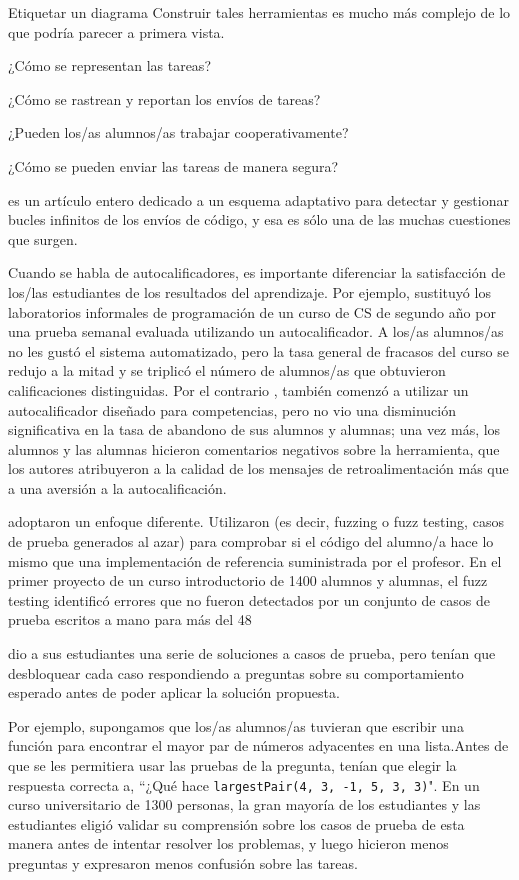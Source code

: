 \begin{aside}{Etiquetar un diagrama}
Construir tales herramientas es mucho más complejo de lo que podría parecer a primera vista.

¿Cómo se representan las tareas?

¿Cómo se rastrean y reportan los envíos de tareas?

¿Pueden los/as alumnos/as trabajar cooperativamente?

¿Cómo se pueden enviar las tareas de manera segura?

\cite{Edwa2014a} es un artículo entero dedicado a un esquema adaptativo para detectar y gestionar bucles infinitos de los envíos de código, y esa es sólo una de las muchas cuestiones que surgen.

Cuando se habla de autocalificadores, 
es importante diferenciar la satisfacción de los/las estudiantes de los resultados del aprendizaje.
Por ejemplo, 
\cite{Magu2018} sustituyó los laboratorios informales de programación de un curso de CS de segundo año por una prueba semanal evaluada utilizando un autocalificador.
A los/as alumnos/as no les gustó el sistema automatizado, 
pero la tasa general de fracasos del curso se redujo a la mitad 
y se triplicó el número de alumnos/as que obtuvieron calificaciones distinguidas.
Por el contrario , 
\cite{Rubi2014} también comenzó a utilizar un autocalificador diseñado para competencias, pero no vio una disminución significativa en la tasa de abandono de sus alumnos y alumnas;
una vez más, 
los alumnos y las alumnas hicieron comentarios negativos sobre la herramienta, 
que los autores atribuyeron a la calidad de los mensajes de retroalimentación más que a una aversión a la autocalificación.

\cite{Srid2016} adoptaron un enfoque diferente.
Utilizaron  
(es decir, fuzzing o fuzz testing, casos de prueba generados al azar) 
para comprobar si el código del alumno/a hace lo mismo que una implementación de referencia suministrada por el profesor.
En el primer proyecto de un curso introductorio de 1400 alumnos y alumnas, el fuzz testing identificó errores que no fueron detectados por un conjunto de casos de prueba escritos a mano para más del 48 %

\cite{Basu2015}  dio a sus estudiantes una serie de soluciones a casos de prueba, 
pero tenían que desbloquear cada caso respondiendo a preguntas sobre su comportamiento esperado
antes de poder aplicar la solución propuesta.

Por ejemplo, 
supongamos que los/as alumnos/as tuvieran que escribir una función para encontrar el mayor par de números adyacentes en una lista.Antes de que se les permitiera usar las pruebas de la pregunta, tenían que elegir la respuesta correcta a, ``¿Qué hace  \texttt{largestPair(4, 3, -1, 5, 3, 3)}".
En un curso universitario de 1300 personas, 
la gran mayoría de los estudiantes y las estudiantes eligió validar su comprensión sobre los casos de prueba de esta manera 
antes de intentar resolver los problemas, 
y luego hicieron menos preguntas y expresaron menos confusión sobre las tareas.


\end{aside}

